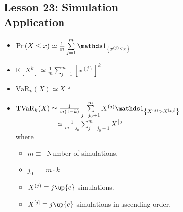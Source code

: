 \documentclass[10pt, french]{article}
\begin{document}
\begin{multicols*}{3}
\section*{Lesson 23: Simulation \\ Application}
\label{Lesson 23}
\begin{itemize}[align=left,leftmargin=*]
    \item $\prob{X \leq x} \simeq \frac{1}{m} \sum\limits_{j=1}^{m} \indic{x^{(j)} \leq x}  $
    \item $\mathrm{E}[X^k] \simeq \frac{1}{m} \sum\limits_{j=1}^{m} [x^{(j)}]^k  $
    \item $\mathrm{VaR}_k(X) \simeq X^{[j]} $
    \item $\mathrm{TVaR}_k(X) \simeq \frac{1}{m(1-k)} \sum\limits_{j=j_0+1}^{m} X^{(j)} \indic{X^{(j)}>X^{[j_0]}} $ \\ $\phantom{\mathrm{TVaR}_k(X)}  \simeq \frac{1}{m-j_0} \sum\limits_{j=j_0+1}^{m} X^{[j]} $ \\ where
    \begin{itemize}
        \item $m \equiv\:$ Number of simulations.
        \item $j_0 = \lfloor m \cdot k \rfloor$
        \item $X^{(j)} \equiv j\up{e}$ simulations.
        \item $X^{[j]} \equiv j\up{e}$ simulations in ascending order.
    \end{itemize} 
\end{itemize}


\end{multicols*}
\end{document}
